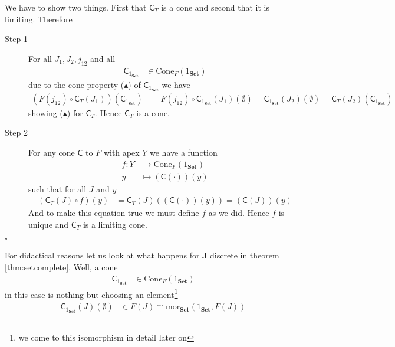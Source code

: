 \begin{prf}
We have to show two things. First that $\mathsf{C}_{T}$ is a cone and second that it is limiting. Therefore
\begin{description}
\item[Step 1]
For all $J_{1},J_{2},j_{12}$ and all
\begin{align*}
  \mathsf{C}_{1_{\mathbf{Set}}}
  &\in
  \mathrm{Cone}_{F}(1_{\mathbf{Set}})
\end{align*}
due to the cone property ($\blacktriangle$) of $\mathsf{C}_{1_{\mathbf{Set}}}$ we have
\begin{align*}
  \left(
    F(j_{12})
    \circ
    \mathsf{C}_{T}(J_{1})
  \right)
  \left(
    \mathsf{C}_{1_{\mathbf{Set}}}
  \right)
  &=
  F(j_{12})
  \circ
  \mathsf{C}_{1_{\mathbf{Set}}}(J_{1})(\emptyset)
  =
  \mathsf{C}_{1_{\mathbf{Set}}}(J_{2})(\emptyset)
  =
  \mathsf{C}_{T}(J_{2})
  \left(
    \mathsf{C}_{1_{\mathbf{Set}}}
  \right)
\end{align*}
showing ($\blacktriangle$) for $\mathsf{C}_{T}$. Hence $\mathsf{C}_{T}$ is a cone.
\item[Step 2]
For any cone $\mathsf{C}$ to $F$ with apex $Y$ we have a function
\begin{align*}
  f
  \colon
  Y
  &\rightarrow
  \mathrm{Cone}_{F}(1_{\mathbf{Set}})
  \\
  y
  &\mapsto
  (\mathsf{C}(\cdot))(y)
\end{align*}
such that for all $J$ and $y$
\begin{align*}
  \left(
    \mathsf{C}_{T}(J)
    \circ
    f
  \right)
  (y)
  &=
  \mathsf{C}_{T}(J)
  \left(
    (\mathsf{C}(\cdot))
    (y)
  \right)
  =
  \left(
    \mathsf{C}(J)
  \right)
  (y)
\end{align*}
And to make this equation true we must define $f$ as we did. Hence $f$ is unique and $\mathsf{C}_{T}$ is a limiting cone.
\end{description}
\phantom{proven}
\hfill
$\square$
\end{prf}
For didactical reasons let us look at what happens for $\mathbf{J}$ discrete in theorem \ref{thm:setcomplete}. Well, a cone
\begin{align*}
  \mathsf{C}_{1_{\mathbf{Set}}}
  &\in
  \mathrm{Cone}_{F}(1_{\mathbf{Set}})
\end{align*}
in this case is nothing but choosing an element\footnote{we come to this isomorphism in detail later on}
\begin{align*}
  \mathsf{C}_{1_{\mathbf{Set}}}(J)(\emptyset)
  &\in
  F(J)
  \cong
  \mathrm{mor}_{\mathbf{Set}}(1_{\mathbf{Set}},F(J))
\end{align*}
